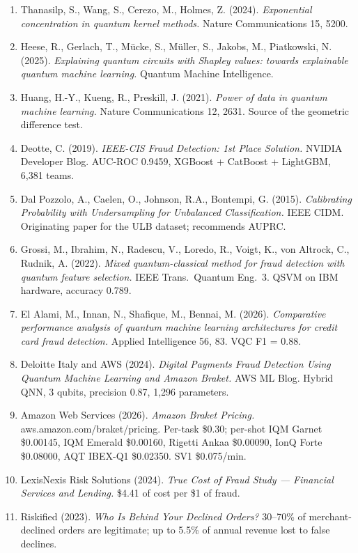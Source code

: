 \documentclass[10pt,a4paper]{article}
\begin{document}
\begin{enumerate}[leftmargin=20pt,itemsep=1.5pt]
\item Thanasilp, S., Wang, S., Cerezo, M., Holmes, Z. (2024). \emph{Exponential concentration in quantum kernel methods.} Nature Communications 15, 5200.
\item Heese, R., Gerlach, T., Mücke, S., Müller, S., Jakobs, M., Piatkowski, N. (2025). \emph{Explaining quantum circuits with Shapley values: towards explainable quantum machine learning.} Quantum Machine Intelligence.
\item Huang, H.-Y., Kueng, R., Preskill, J. (2021). \emph{Power of data in quantum machine learning.} Nature Communications 12, 2631. Source of the geometric difference test.
\item Deotte, C. (2019). \emph{IEEE-CIS Fraud Detection: 1st Place Solution.} NVIDIA Developer Blog. AUC-ROC 0.9459, XGBoost + CatBoost + LightGBM, 6{,}381 teams.
\item Dal Pozzolo, A., Caelen, O., Johnson, R.A., Bontempi, G. (2015). \emph{Calibrating Probability with Undersampling for Unbalanced Classification.} IEEE CIDM. Originating paper for the ULB dataset; recommends AUPRC.
\item Grossi, M., Ibrahim, N., Radescu, V., Loredo, R., Voigt, K., von Altrock, C., Rudnik, A. (2022). \emph{Mixed quantum-classical method for fraud detection with quantum feature selection.} IEEE Trans.\ Quantum Eng.\ 3. QSVM on IBM hardware, accuracy 0.789.
\item El Alami, M., Innan, N., Shafique, M., Bennai, M. (2026). \emph{Comparative performance analysis of quantum machine learning architectures for credit card fraud detection.} Applied Intelligence 56, 83. VQC F1 = 0.88.
\item Deloitte Italy and AWS (2024). \emph{Digital Payments Fraud Detection Using Quantum Machine Learning and Amazon Braket.} AWS ML Blog. Hybrid QNN, 3 qubits, precision 0.87, 1{,}296 parameters.
\item Amazon Web Services (2026). \emph{Amazon Braket Pricing.} aws.amazon.com/braket/pricing. Per-task \$0.30; per-shot IQM Garnet \$0.00145, IQM Emerald \$0.00160, Rigetti Ankaa \$0.00090, IonQ Forte \$0.08000, AQT IBEX-Q1 \$0.02350. SV1 \$0.075/min.
\item LexisNexis Risk Solutions (2024). \emph{True Cost of Fraud Study --- Financial Services and Lending.} \$4.41 of cost per \$1 of fraud.
\item Riskified (2023). \emph{Who Is Behind Your Declined Orders?} 30--70\% of merchant-declined orders are legitimate; up to 5.5\% of annual revenue lost to false declines.
\end{enumerate}
\end{document}
